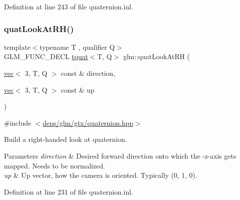 Definition at line 243 of file quaternion.\+inl.

\mbox{\label{group__gtx__quaternion_gad30cbeb78315773b6d18d9d1c1c75b77}} 
\subsubsection{\texorpdfstring{quat\+Look\+At\+R\+H()}{quatLookAtRH()}}
{\footnotesize\ttfamily template$<$typename T , qualifier Q$>$ \\
G\+L\+M\+\_\+\+F\+U\+N\+C\+\_\+\+D\+E\+CL \hyperlink{structglm_1_1tquat}{tquat}$<$T, Q$>$ glm\+::quat\+Look\+At\+RH (\begin{DoxyParamCaption}\item[{\hyperlink{structglm_1_1vec}{vec}$<$ 3, T, Q $>$ const \&}]{direction,  }\item[{\hyperlink{structglm_1_1vec}{vec}$<$ 3, T, Q $>$ const \&}]{up }\end{DoxyParamCaption})}



{\ttfamily \#include $<$\hyperlink{gtx_2quaternion_8hpp}{deps/glm/gtx/quaternion.\+hpp}$>$}

Build a right-\/handed look at quaternion.


\begin{DoxyParams}{Parameters}
{\em direction} & Desired forward direction onto which the -\/z-\/axis gets mapped. Needs to be normalized. \\
\hline
{\em up} & Up vector, how the camera is oriented. Typically (0, 1, 0). \\
\hline
\end{DoxyParams}


Definition at line 231 of file quaternion.\+inl.

\mbox{\label{group__gtx__quaternion_ga49730f975e7f0ee3862a20b767aba583}} 
